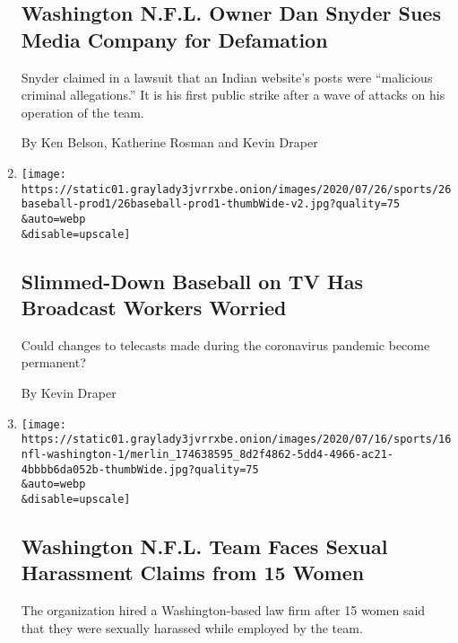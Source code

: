 \begin{enumerate}
  \hypertarget{washington-nfl-owner-dan-snyder-sues-media-company-for-defamation}{%
  \subsection{Washington N.F.L. Owner Dan Snyder Sues Media Company for
  Defamation}\label{washington-nfl-owner-dan-snyder-sues-media-company-for-defamation}}

  Snyder claimed in a lawsuit that an Indian website's posts were
  ``malicious criminal allegations.'' It is his first public strike
  after a wave of attacks on his operation of the team.

  By Ken Belson, Katherine Rosman and Kevin Draper
\item
  \href{/2020/07/26/sports/baseball/baseball-tv-camera-operators.html}{}

  \texttt{[image: https://static01.graylady3jvrrxbe.onion/images/2020/07/26/sports/26baseball-prod1/26baseball-prod1-thumbWide-v2.jpg?quality=75\\\&auto=webp\\\&disable=upscale]}

  \hypertarget{slimmed-down-baseball-on-tv-has-broadcast-workers-worried}{%
  \subsection{Slimmed-Down Baseball on TV Has Broadcast Workers
  Worried}\label{slimmed-down-baseball-on-tv-has-broadcast-workers-worried}}

  Could changes to telecasts made during the coronavirus pandemic become
  permanent?

  By Kevin Draper
\item
  \href{/2020/07/16/sports/football/washington-sexual-assault-harassment-dan-snyder.html}{}

  \texttt{[image: https://static01.graylady3jvrrxbe.onion/images/2020/07/16/sports/16nfl-washington-1/merlin\_174638595\_8d2f4862-5dd4-4966-ac21-4bbbb6da052b-thumbWide.jpg?quality=75\\\&auto=webp\\\&disable=upscale]}

  \hypertarget{washington-nfl-team-faces-sexual-harassment-claims-from-15-women}{%
  \subsection{Washington N.F.L. Team Faces Sexual Harassment Claims from
  15
  Women}\label{washington-nfl-team-faces-sexual-harassment-claims-from-15-women}}

  The organization hired a Washington-based law firm after 15 women said
  that they were sexually harassed while employed by the team.


\end{enumerate}
